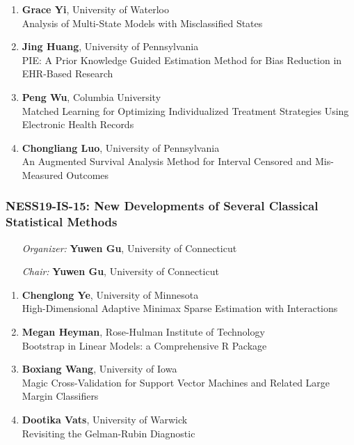 \begin{enumerate}
\item \textbf{Grace Yi}, University of Waterloo \\
Analysis of Multi-State Models with Misclassified States
\item \textbf{Jing Huang}, University of Pennsylvania \\
PIE: A Prior Knowledge Guided Estimation Method for Bias Reduction in EHR-Based Research
\item \textbf{Peng Wu}, Columbia University \\
Matched Learning for Optimizing Individualized Treatment Strategies Using Electronic Health Records
\item \textbf{Chongliang Luo}, University of Pennsylvania \\
An Augmented Survival Analysis Method for Interval Censored and Mis-Measured Outcomes
\end{enumerate}

\subsubsection*{NESS19-IS-15: New Developments of Several Classical Statistical Methods}

\begin{enumerate}[align=left]
\item [\emph{Organizer:}] \textbf{Yuwen Gu}, University of Connecticut \\
\item [\emph{Chair:}] \textbf{Yuwen Gu}, University of Connecticut
\end{enumerate}

\begin{enumerate}
\item \textbf{Chenglong Ye}, University of Minnesota \\
High-Dimensional Adaptive Minimax Sparse Estimation with Interactions
\item \textbf{Megan Heyman}, Rose-Hulman Institute of Technology \\
Bootstrap in Linear Models:  a Comprehensive R Package
\item \textbf{Boxiang Wang}, University of Iowa \\
Magic Cross-Validation for Support Vector Machines and Related Large Margin Classifiers
\item \textbf{Dootika Vats}, University of Warwick \\
Revisiting the Gelman-Rubin Diagnostic
\end{enumerate}

